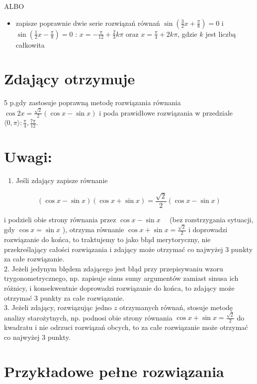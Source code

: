 \documentclass[10pt]{article}
\begin{document}
ALBO

\begin{itemize}
  \item zapisze poprawnie dwie serie rozwiązań równań $\sin \left(\frac{3}{2} x+\frac{\pi}{8}\right)=0$ i $\sin \left(\frac{1}{2} x-\frac{\pi}{8}\right)=0$ : $x=-\frac{\pi}{12}+\frac{2}{3} k \pi$ oraz $x=\frac{\pi}{4}+2 k \pi$, gdzie $k$ jest liczbą całkowita
\end{itemize}

\section*{Zdający otrzymuje}
 5 p.gdy zastosuje poprawną metodę rozwiązania równania $\cos 2 x=\frac{\sqrt{2}}{2}(\cos x-\sin x)$ i poda prawidłowe rozwiązania w przedziale $\langle 0, \pi\rangle: \frac{\pi}{4}, \frac{7 \pi}{12}$.

\section*{Uwagi:}
\begin{enumerate}
  \item Jeśli zdający zapisze równanie
\end{enumerate}

$$
(\cos x-\sin x)(\cos x+\sin x)=\frac{\sqrt{2}}{2}(\cos x-\sin x)
$$

i podzieli obie strony równania przez $\cos x-\sin x \quad$ (bez rozstrzygania sytuacji, gdy $\cos x=\sin x$ ), otrzyma równanie $\cos x+\sin x=\frac{\sqrt{2}}{2}$ i doprowadzi rozwiązanie do końca, to traktujemy to jako błąd merytoryczny, nie przekreślający całości rozwiązania i zdający może otrzymać co najwyżej 3 punkty za całe rozwiązanie.\\
2. Jeżeli jedynym błędem zdającego jest błąd przy przepisywaniu wzoru trygonometrycznego, np. zapisuje sinus sumy argumentów zamiast sinusa ich różnicy, i konsekwentnie doprowadzi rozwiązanie do końca, to zdający może otrzymać 3 punkty za całe rozwiązanie.\\
3. Jeżeli zdający, rozwiązując jedno $z$ otrzymanych równań, stosuje metodę analizy starożytnych, np. podnosi obie strony równania $\cos x+\sin x=\frac{\sqrt{2}}{2}$ do kwadratu i nie odrzuci rozwiązań obcych, to za całe rozwiązanie może otrzymać co najwyżej 3 punkty.

\section*{Przykładowe pełne rozwiązania}
\end{document}
